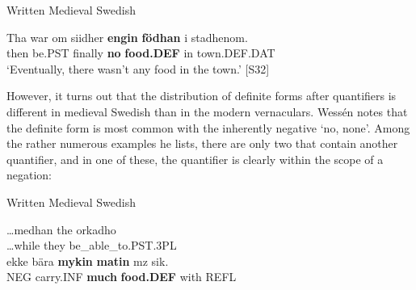\item 

\label{bkm:Ref78603361}Written Medieval Swedish



 \ea\label{}
\gll Tha  war  om siidher  \textbf{engin} \textbf{födhan} i  stadhenom.\\


then  be.PST  finally  \textbf{no} \textbf{food.DEF} in  town.DEF.DAT\\

\glt ‘Eventually, there wasn’t any food in the town.’ [S32]

\z

However, it turns out that the distribution of definite forms after quantifiers is different in medieval Swedish than in the modern vernaculars. Wessén notes that the definite form is most common with the inherently negative  ‘no, none’. Among the rather numerous examples he lists, there are only two that contain another quantifier, and in one of these, the quantifier is clearly within the scope of a negation: 


\item 

Written Medieval Swedish



 \ea\label{}
\gll …medhan  the  orkadho\\


…while  they  be\_able\_to.PST.3PL\\

 \ea\label{}
\gll ekke  bära  \textbf{mykin}\textbf{  matin} mz  sik.\\


NEG  carry.INF  \textbf{much} \textbf{food.DEF} with  REFL\\

